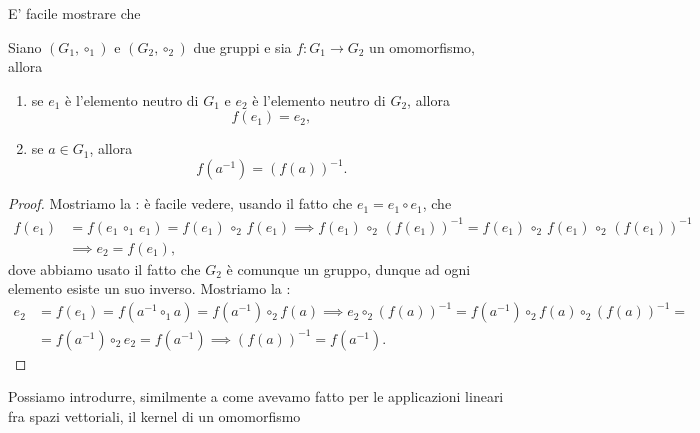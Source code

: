 E' facile mostrare che
\begin{exercise}
	Siano $(G_1, \circ_1)$ e $(G_2, \circ_2)$ due gruppi e sia $f: G_1 \to G_2$ un omomorfismo, allora
	\begin{enumerate}[label=\protect\circled{\arabic*}]
		\item se $e_1$ è l'elemento neutro di $G_1$ e $e_2$ è l'elemento neutro di $G_2$, allora
		\begin{equation}
			f(e_1) = e_2,
		\end{equation}
		\item se $a \in G_1$, allora
		$$
			f(a^{-1}) = (f(a))^{-1}.
		$$
	\end{enumerate}
\end{exercise}
\begin{proof}
	Mostriamo la : è facile vedere, usando il fatto che $e_1 = e_1 \circ e_1$, che
	\begin{align}
		f(e_1) &= f(e_1 \, \circ_1 \, e_1) = f(e_1) \, \circ_2 \, f(e_1) \implies f(e_1) \, \circ_2 \, (f(e_1))^{-1} = f(e_1) \, \circ_2 \, f(e_1) \, \circ_2 \,(f(e_1))^{-1} \nonumber \\
		&\implies e_2 = f(e_1),
	\end{align}
	dove abbiamo usato il fatto che $G_2$ è comunque un gruppo, dunque ad ogni elemento esiste un suo inverso.
	Mostriamo la : 
	\begin{align}
		e_2 &= f(e_1) = f(a^{-1} \circ_1 a) = f(a^{-1}) \circ_2 f(a) \implies e_2 \circ_2 (f(a))^{-1} = f(a^{-1}) \circ_2 f(a) \circ_2 (f(a))^{-1} = \nonumber \\
			&= f(a^{-1}) \circ_2 e_2 = f(a^{-1}) \implies (f(a))^{-1} = f(a^{-1}).
	\end{align}
\end{proof}
Possiamo introdurre, similmente a come avevamo fatto per le applicazioni lineari fra spazi vettoriali, il kernel di un omomorfismo

